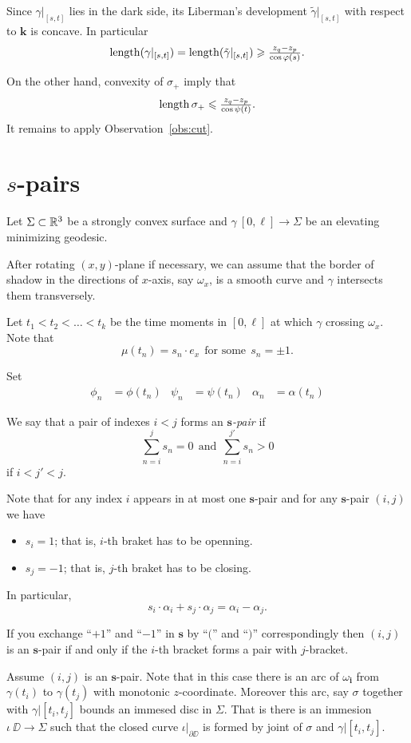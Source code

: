\documentclass[a4paper,10pt]{amsart}
\begin{document}
Since $\gamma|_{[s,t]}$ lies in the dark side,
its Liberman's development $\tilde\gamma|_{[s,t]}$ 
with respect to $\bm{k}$ is concave.
In particular 
\[\mathop{\rm length}\nolimits(\gamma|_{[s,t]})
=
\mathop{\rm length}\nolimits(\tilde\gamma|_{[s,t]})
\geqslant
\tfrac{z_q-z_p}{\cos\varphi(s)}.\]

On the other hand, convexity of $\sigma_+$ imply that
\[\mathop{\rm length}\nolimits\sigma_+\leqslant \tfrac{z_q-z_p}{\cos\psi(t)}.\]
It remains to apply Observation~\ref{obs:cut}.
\qeds

\section{$s$-pairs}

Let $\Sigma\subset \mathbb{R}^3$ 
be a strongly convex surface
and $\gamma\:[0,\ell]\to\Sigma$ be an elevating minimizing geodesic.

After rotating $(x,y)$-plane if necessary, 
we can assume that the border of shadow in the directions of $x$-axis, say $\omega_x$, 
is a smooth curve and $\gamma$ intersects them transversely.

Let $t_1<t_2<\dots<t_k$ be the time moments in $[0,\ell]$ 
at which $\gamma$ crossing $\omega_x$.
Note that 
\[\mu(t_n)=s_n\cdot e_x\ \ \text{for some}\ \  s_n=\pm1.\]

Set
\begin{align*}
\phi_n&=\phi(t_n)
&
\psi_n&=\psi(t_n)
&
\alpha_n&=\alpha(t_n)
\end{align*}

We say that a pair of indexes $i<j$
forms an \emph{$\bm{s}$-pair} 
if 
\[
\sum_{n=i}^js_n=0\ \ 
\text{and}\ \ 
\sum_{n=i}^{j'}s_n>0
\]
if $i<j'<j$.

Note that for any index $i$ appears in at most one $\bm{s}$-pair and 
for any $\bm{s}$-pair $(i,j)$ we have
\begin{itemize}
\item $s_i=1$; that is, $i$-th braket has to be openning.
 \item $s_j=-1$; that is, $j$-th braket has to be closing.
\end{itemize}
In particular,
\[s_i\cdot\alpha_i+s_j\cdot\alpha_j=\alpha_i-\alpha_j.\]

If you exchange ``$+1$'' and ``$-1$'' in $\bm{s}$ by ``$($'' and ``$)$'' correspondingly then $(i,j)$ is an $\bm{s}$-pair
if and only if the $i$-th bracket forms a pair with $j$-bracket.

\parbf{Embedded disc interpretation.}
Assume $(i,j)$ is an $\bm{s}$-pair.
Note that in this case there is an arc of $\omega_{\bm{i}}$
from $\gamma(t_i)$ to $\gamma(t_j)$
with monotonic $z$-coordinate.
Moreover this arc, say $\sigma$ together with $\gamma|{[t_i,t_j]}$ bounds an immesed disc in $\Sigma$.
That is there is an immesion $\iota\:\DD\to\Sigma$ 
such that the closed curve $\iota|_{\partial \DD}$ is formed by joint of $\sigma$ and $\gamma|{[t_i,t_j]}$.
\end{document}
